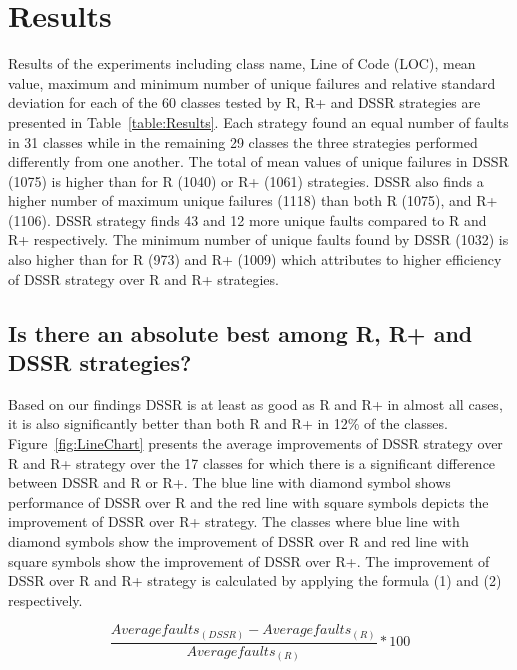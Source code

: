 \documentclass[conference]{IEEEtran}
\begin{document}
\section{Results}\label{sec:res}
Results of the experiments including class name, Line of Code (LOC), mean value, maximum and minimum number of unique failures and relative standard deviation for each of the 60 classes tested by R, R+ and DSSR strategies are presented in Table~\ref{table:Results}. Each strategy found an equal number of faults in 31 classes while in the remaining 29 classes the three strategies performed differently from one another. The total of mean values of unique failures in DSSR (1075) is higher than for R (1040) or R+ (1061) strategies. 
DSSR also finds a higher number of maximum unique failures (1118) than both R (1075), and R+ (1106). DSSR strategy finds 43 and 12 more unique faults compared to R and R+ respectively. The minimum number of unique faults found by DSSR (1032) is also higher than for R (973) and R+ (1009) which attributes to higher efficiency of DSSR strategy over R and R+ strategies. 


\subsection{Is there an absolute best among R, R+ and DSSR strategies?}
Based on our findings DSSR is at least as good as R and R+ in almost all cases, it is also significantly better than both R and R+ in 12\% of the classes. Figure~\ref{fig:LineChart} presents the average improvements of DSSR strategy over R and R+ strategy over the 17 classes for which there is a significant difference between DSSR and R or R+. The blue line with diamond symbol shows performance of DSSR over R and the red line with square symbols depicts the improvement of DSSR over R+ strategy. The classes where blue line with diamond symbols show the improvement of DSSR over R and red line with square symbols show the improvement of DSSR over R+. The improvement of DSSR over R and R+ strategy is calculated by applying the formula (1) and (2) respectively.

\begin{equation} \frac{Averagefaults_{(DSSR)} - Averagefaults_{(R)}}{Averagefaults_{(R)}} * 100  \end{equation}
\end{document}
